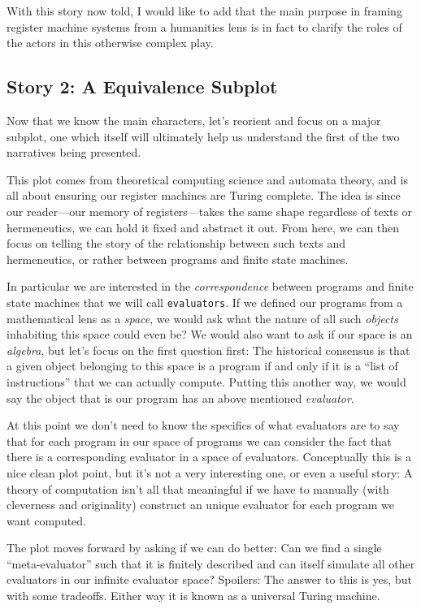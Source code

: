 \documentclass[twoside]{article}
\begin{document}
With this story now told, I would like to add that the main purpose in framing register machine systems from
a humanities lens is in fact to clarify the roles of the actors in this otherwise complex play.

\subsection*{Story 2: A Equivalence Subplot}

Now that we know the main characters, let's reorient and focus on a major subplot, one which itself will ultimately
help us understand the first of the two narratives being presented.

This plot comes from theoretical computing science and automata theory, and is all about ensuring our register machines
are Turing complete. The idea is since our reader---our memory of registers---takes the same shape regardless of texts
or hermeneutics, we can hold it fixed and abstract it out. From here, we can then focus on telling the story of the
relationship between such texts and hermeneutics, or rather between programs and finite state machines.

In particular we are interested in the \emph{correspondence} between programs and finite state machines that we will call
\texttt{evaluators}. If we defined our programs from a mathematical lens as a \emph{space}, we would ask what the nature
of all such \emph{objects} inhabiting this space could even be? We would also want to ask if our space is an \emph{algebra},
but let's focus on the first question first: The historical consensus is that a given object belonging to this space is
a program if and only if it is a ``list of instructions'' that we can actually compute. Putting this another way,
we would say the object that is our program has an above mentioned \emph{evaluator}.

At this point we don't need to know the specifics of what evaluators are to say that for each program in our space of programs
we can consider the fact that there is a corresponding evaluator in a space of evaluators. Conceptually this is a nice clean
plot point, but it's not a very interesting one, or even a useful story: A theory of computation isn't all that meaningful
if we have to manually (with cleverness and originality) construct an unique evaluator for each program we want computed.

The plot moves forward by asking if we can do better: Can we find a single ``meta-evaluator'' such that it is finitely
described and can itself simulate all other evaluators in our infinite evaluator space? Spoilers: The answer to this
is yes, but with some tradeoffs. Either way it is known as a universal Turing machine.
\end{document}
